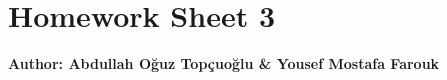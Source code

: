 \documentclass{article}
\begin{document}
\section*{\huge Homework Sheet 3}
\begin{flushright}
   \textbf{Author: Abdullah Oğuz Topçuoğlu \& Yousef Mostafa Farouk}
\end{flushright}

\end{document}
